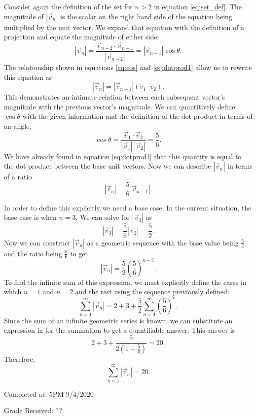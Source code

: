 \documentclass{article}
\begin{document}
Consider again the definition of the set for $n>2$ in equation \ref{eq:set_def}. The magnitude of $|\vec{v}_n|$ is the scalar on the right hand side of the equation being multiplied by the unit vector. We expand that equation with the definition of a projection and equate the magnitude of either side:
\[
    |\vec{v}_n|=\frac{\vec{v}_{n-2} \cdot \vec{v}_{n-1}}{|\vec{v}_{n-2}|}=|\vec{v}_{n-1}|\cos\theta.
\]
The relationship shown in equations \ref{eq:cos} and \ref{eq:dotprod1} allow us to rewrite this equation as
\[
    |\vec{v}_n|=|\vec{v}_{n-1}|(\hat{v}_1 \cdot \hat{v}_2).
\] 
This demonstrates an intimate relation between each subsequent vector's magnitude with the previous vector's magnitude. We can quantitively define $\cos\theta$ with the given information and the definition of the dot product in terms of an angle,
\[
    \cos\theta=\frac{\vec{v}_1\cdot\vec{v}_2}{|\vec{v}_1|\:|\vec{v}_2|}=\frac{5}{6}.
\]
We have already found in equation \ref{eq:dotprod1} that this quantity is equal to the dot product between the base unit vectors. Now we can describe $|\vec{v}_n|$ in terms of a ratio
\[
    |\vec{v}_n|=\frac{5}{6}|\vec{v}_{n-1}|.
\]

In order to define this explicitly we need a base case. In the current situation, the base case is when $n=3$. We can solve for $|\vec{v}_3|$ as
\[
    |\vec{v}_3|=\frac{5}{6}|\vec{v}_2|=\frac{5}{2}.
\]
Now we can construct $|\vec{v}_n|$ as a geometric sequence with the base value being $\frac{5}{2}$ and the ratio being $\frac{5}{6}$ to get
\[
    |\vec{v}_n|=\frac{5}{2}\left(\frac{5}{6}\right)^{n-3}. %
\]
To find the infinite sum of this expression, we must explicitly define the cases in which $n=1$ and $n=2$ and the rest using the sequence previously defined:
\[
    \sum_{n=1}^\infty |\vec{v}_n|=2+3+\frac{5}{2}\sum_{n=0}^\infty \left(\frac{5}{6}\right)^n.
\]
Since the sum of an infinite geometric series is known, we can substitute an expression in for the summation to get a quantifiable answer. This answer is
\[
    2+3+\frac{5}{2\left(1-\frac{5}{6}\right)}=20.
\]  
Therefore,
\[
    \sum_{n=1}^\infty |\vec{v}_n|=20.
\]

\vspace{2cm}

\noindent
Completed at: 5PM 9/4/2020

\noindent
Grade Received: ??
\end{document}
